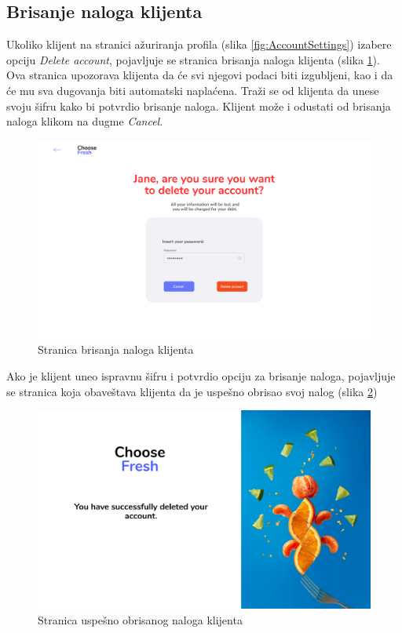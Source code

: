 \subsection{Brisanje naloga klijenta}

Ukoliko klijent na stranici ažuriranja profila (slika \ref{fig:AccountSettings}) izabere opciju \textit{Delete account}, pojavljuje se stranica brisanja naloga klijenta (slika \ref{fig:DeleteAccount}). Ova stranica upozorava klijenta da će svi njegovi podaci biti izgubljeni, kao i da će mu sva dugovanja biti automatski naplaćena. Traži se od klijenta da unese svoju šifru kako bi potvrdio brisanje naloga. Klijent može i odustati od brisanja naloga klikom na dugme \textit{Cancel}.
\begin{figure}[H]
	\begin{center}
		\includegraphics[width=\textwidth]{UI/DeleteAccount.png}
    		\caption{Stranica brisanja naloga klijenta}
    \label{fig:DeleteAccount}
    \end{center}
\end{figure}

Ako je klijent uneo ispravnu šifru i potvrdio opciju za brisanje naloga, pojavljuje se stranica koja obaveštava klijenta da je uspešno obrisao svoj nalog (slika \ref{fig:DeleteAccountSuccessful})

\begin{figure}[H]
	\begin{center}
		\includegraphics[width=\textwidth]{UI/DeleteAccountSuccessful.png}
    		\caption{Stranica uspešno obrisanog naloga klijenta}
    \label{fig:DeleteAccountSuccessful}
    \end{center}
\end{figure}
